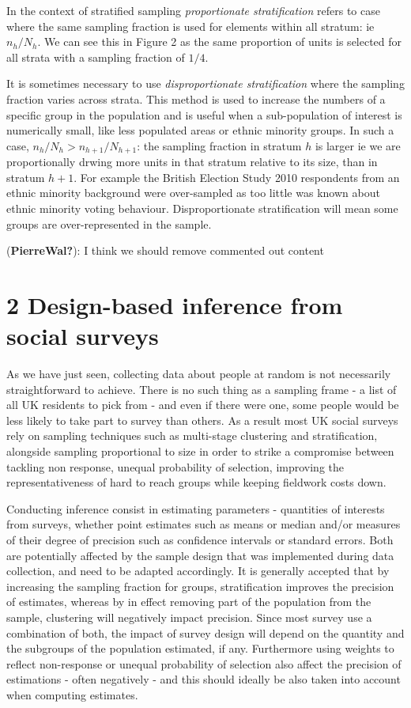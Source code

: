 \documentclass[
  14,
  a4paper,
  DIV=11,
  numbers=noendperiod]{scrartcl}
\begin{document}
In the context of stratified sampling \emph{proportionate
stratification} refers to case where the same sampling fraction is used
for elements within all stratum: ie \(n_h/N_h\). We can see this in
Figure 2 as the same proportion of units is selected for all strata with
a sampling fraction of \(1/4\).

It is sometimes necessary to use \emph{disproportionate stratification}
where the sampling fraction varies across strata. This method is used to
increase the numbers of a specific group in the population and is useful
when a sub-population of interest is numerically small, like less
populated areas or ethnic minority groups. In such a case,
\(n_h/N_h>n_{h+1}/N_{h+1}\): the sampling fraction in stratum \(h\) is
larger ie we are proportionally drwing more units in that stratum
relative to its size, than in stratum \(h+1\). For example the British
Election Study 2010 respondents from an ethnic minority background were
over-sampled as too little was known about ethnic minority voting
behaviour. Disproportionate stratification will mean some groups are
over-represented in the sample.

(\textbf{PierreWal?}): I think we should remove commented out content

\hypertarget{design-based-inference-from-social-surveys}{%
\section{2 Design-based inference from social
surveys}\label{design-based-inference-from-social-surveys}}

As we have just seen, collecting data about people at random is not
necessarily straightforward to achieve. There is no such thing as a
sampling frame - a list of all UK residents to pick from - and even if
there were one, some people would be less likely to take part to survey
than others. As a result most UK social surveys rely on sampling
techniques such as multi-stage clustering and stratification, alongside
sampling proportional to size in order to strike a compromise between
tackling non response, unequal probability of selection, improving the
representativeness of hard to reach groups while keeping fieldwork costs
down.

Conducting inference consist in estimating parameters - quantities of
interests from surveys, whether point estimates such as means or median
and/or measures of their degree of precision such as confidence
intervals or standard errors. Both are potentially affected by the
sample design that was implemented during data collection, and need to
be adapted accordingly. It is generally accepted that by increasing the
sampling fraction for groups, stratification improves the precision of
estimates, whereas by in effect removing part of the population from the
sample, clustering will negatively impact precision. Since most survey
use a combination of both, the impact of survey design will depend on
the quantity and the subgroups of the population estimated, if any.
Furthermore using weights to reflect non-response or unequal probability
of selection also affect the precision of estimations - often negatively
- and this should ideally be also taken into account when computing
estimates.
\end{document}
